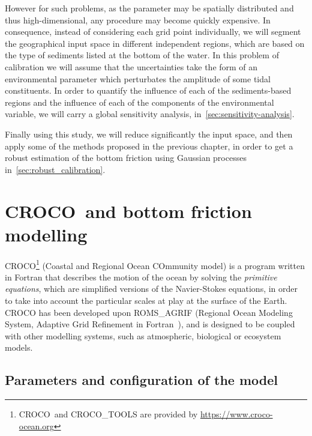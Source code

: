 \documentclass[../../Main_ManuscritThese.tex]{subfiles}
\newcommand{\CROCO}{CROCO}
\begin{document}
However for such problems, as the parameter may be spatially
distributed and thus high-dimensional, any procedure may become
quickly expensive.  In consequence, instead of considering each grid
point individually, we will segment the geographical input space in
different independent regions, which are based on the type of
sediments listed at the bottom of the water. In this problem of
calibration we will assume that the uncertainties take the form of an
environmental parameter which perturbates the amplitude of some tidal
constituents.  In order to quantify the influence of each of the
sediments-based regions and the influence of each of the components of the
environmental variable, we will carry a global sensitivity analysis,
in~\cref{sec:sensitivity-analysis}.

Finally using this study, we will reduce significantly the input
space, and then apply some of the methods proposed in the previous
chapter, in order to get a robust estimation of the bottom friction
using Gaussian processes in~\cref{sec:robust_calibration}.


\section{\CROCO\ and bottom friction modelling}
\label{sec:croco_bottom_fr}
\CROCO{}\footnote{\CROCO\ and CROCO\_TOOLS are provided by
  \url{https://www.croco-ocean.org}} (Coastal and Regional Ocean
COmmunity model) is a program written in Fortran that describes the
motion of the ocean by solving the \emph{primitive equations}, which
are simplified versions of the Navier-Stokes equations, in order to
take into account the particular scales at play at the surface of the
Earth. \CROCO{} has been developed upon
ROMS\_AGRIF%
(Regional Ocean Modeling System, Adaptive Grid Refinement in
Fortran~\cite{debreu_two-way_2012}), and is designed to be coupled with
other modelling systems, such as atmospheric, biological or ecosystem
models.



\subsection{Parameters and configuration of the model}
\label{sec:geographical_setting}
\end{document}
